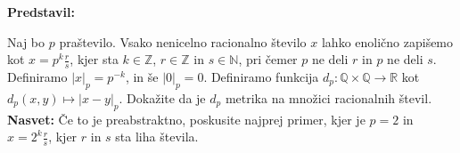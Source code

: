 \textbf{Predstavil: }

Naj bo $p$ praštevilo. Vsako nenicelno racionalno število $x$ lahko enolično zapišemo kot $x = p^k \frac{r}{s}$, kjer sta $k \in \mathbb{Z}$, $r \in \mathbb{Z}$ in $s \in \mathbb{N}$, pri čemer $p$ ne deli $r$ in $p$ ne deli $s$. Definiramo $|x|_p = p^{-k}$, in še $|0|_p = 0$.
%
Definiramo funkcija $d_{p}: \mathbb{Q} \times \mathbb{Q}\to \mathbb{R}$ kot $d_{p}(x,y) \mapsto |x - y|_p$. 
Dokažite da je $d_{p}$ metrika na množici racionalnih števil. 
% 
\textbf{Nasvet:} Če to je preabstraktno, poskusite najprej primer, kjer je $p=2$ in $x = 2^k \frac{r}{s}$, kjer $r$ in $s$ sta liha števila.